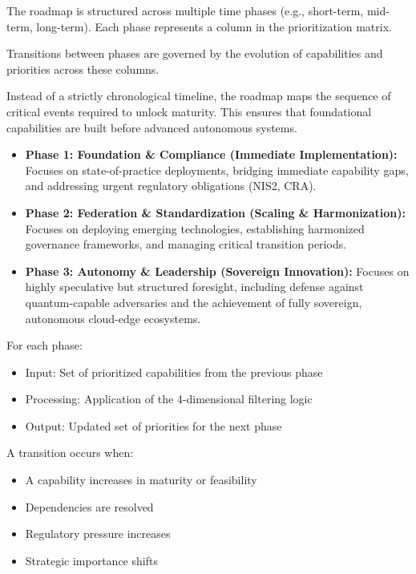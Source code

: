 \documentclass{ieeeaccess}
\begin{document}
The roadmap is structured across multiple time phases (e.g., short-term, mid-term, long-term). Each phase represents a column in the prioritization matrix.

Transitions between phases are governed by the evolution of capabilities and priorities across these columns.

Instead of a strictly chronological timeline, the roadmap maps the sequence of critical events required to unlock maturity. This ensures that foundational capabilities are built before advanced autonomous systems.

\begin{itemize}
    \item \textbf{Phase 1: Foundation \& Compliance (Immediate Implementation):} Focuses on state-of-practice deployments, bridging immediate capability gaps, and addressing urgent regulatory obligations (NIS2, CRA).
    \item \textbf{Phase 2: Federation \& Standardization (Scaling \& Harmonization):} Focuses on deploying emerging technologies, establishing harmonized governance frameworks, and managing critical transition periods.
    \item \textbf{Phase 3: Autonomy \& Leadership (Sovereign Innovation):} Focuses on highly speculative but structured foresight, including defense against quantum-capable adversaries and the achievement of fully sovereign, autonomous cloud-edge ecosystems.
\end{itemize}



For each phase:

\begin{itemize}
    \item Input: Set of prioritized capabilities from the previous phase
    \item Processing: Application of the 4-dimensional filtering logic
    \item Output: Updated set of priorities for the next phase
\end{itemize}

A transition occurs when:

\begin{itemize}
    \item A capability increases in maturity or feasibility
    \item Dependencies are resolved
    \item Regulatory pressure increases
    \item Strategic importance shifts
\end{itemize}
\end{document}
